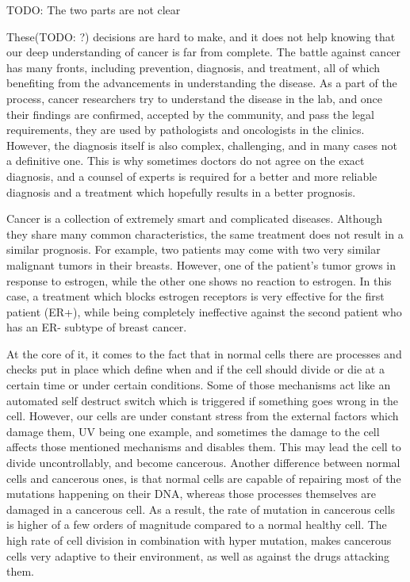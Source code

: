 TODO: The two parts are not clear

These(TODO: ?) decisions are hard to make, and it does not help knowing that
our deep understanding of cancer is far from complete. The battle against
cancer has many fronts, including prevention, diagnosis, and treatment, all of
which benefiting from the advancements in understanding the disease. As a part
of the process, cancer researchers try to understand the disease in the lab,
and once their findings are confirmed, accepted by the community, and pass the
legal requirements, they are used by pathologists and oncologists in the
clinics. However, the diagnosis itself is also complex, challenging, and in
many cases not a definitive one. This is why sometimes doctors do not agree on
the exact diagnosis, and a counsel of experts is required for a better and more
reliable diagnosis and a treatment which hopefully results in a better
prognosis.

Cancer is a collection of extremely smart and complicated diseases. Although
they share many common characteristics, the same treatment does not result in a
similar prognosis. For example, two patients may come with two very similar
malignant tumors in their breasts. However, one of the patient's tumor grows in
response to estrogen, while the other one shows no reaction to estrogen. In
this case, a treatment which blocks estrogen receptors is very effective for
the first patient (ER+), while being completely ineffective against the second
patient who has an ER- subtype of breast cancer.

At the core of it, it comes to the fact that in normal cells there are
processes and checks put in place which define when and if the cell should
divide or die at a certain time or under certain conditions. Some of those
mechanisms act like an automated self destruct switch which is triggered if
something goes wrong in the cell. However, our cells are under constant stress
from the external factors which damage them, UV being one example, and
sometimes the damage to the cell affects those mentioned mechanisms and
disables them. This may lead the cell to divide uncontrollably, and become
cancerous. Another difference between normal cells and cancerous ones, is that
normal cells are capable of repairing most of the mutations happening on their
DNA, whereas those processes themselves are damaged in a cancerous cell. As a
result, the rate of mutation in cancerous cells is higher of a few orders of
magnitude compared to a normal healthy cell. The high rate of cell division in
combination with hyper mutation, makes cancerous cells very adaptive to their
environment, as well as against the drugs attacking them.

